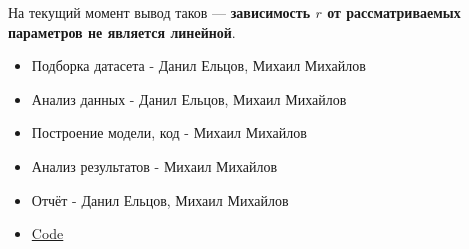 \documentclass{article}
\begin{document}
На текущий момент вывод таков --- \textbf{зависимость \(r\) от рассматриваемых параметров не является линейной}.

\begin{itemize}
    \item Подборка датасета - Данил Ельцов, Михаил Михайлов
    \item Анализ данных - Данил Ельцов, Михаил Михайлов
    \item Построение модели, код - Михаил Михайлов
    \item Анализ результатов - Михаил Михайлов
    \item Отчёт - Данил Ельцов, Михаил Михайлов
    \item\href{https://github.com/Desiment/ml-study/blob/main/linear_regression}{Code}
\end{itemize}
\end{document}
